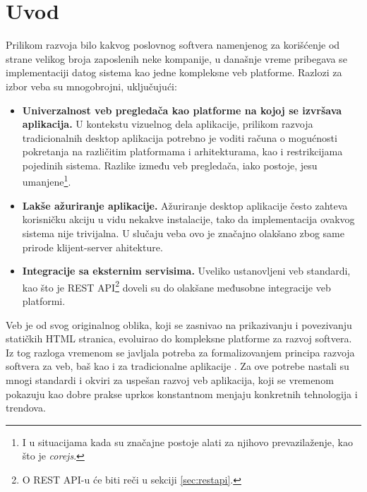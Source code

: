 \documentclass[12pt,oneside]{memoir}
\begin{document}
\frontmatter
\naslovna
\komisija
\apstrakt
\tableofcontents*

\mainmatter

\chapter{Uvod}

Prilikom razvoja bilo kakvog poslovnog softvera namenjenog za korišćenje od strane velikog broja zaposlenih neke kompanije, u današnje vreme pribegava se implementaciji datog sistema kao jedne kompleksne veb platforme. Razlozi za izbor veba su mnogobrojni, uključujući:

\begin{itemize}
    \item \textbf{Univerzalnost veb pregledača kao platforme na kojoj se izvršava aplikacija.} U kontekstu vizuelnog dela aplikacije, prilikom razvoja tradicionalnih desktop aplikacija potrebno je voditi računa o mogućnosti pokretanja na različitim platformama i arhitekturama, kao i restrikcijama pojedinih sistema. Razlike između veb pregledača, iako postoje, jesu umanjene\footnote{I u situacijama kada su značajne postoje alati za njihovo prevazilaženje, kao što je \textit{corejs}.}. 
    \item \textbf{Lakše ažuriranje aplikacije.} Ažuriranje desktop aplikacije često zahteva korisničku akciju u vidu nekakve instalacije, tako da implementacija ovakvog sistema nije trivijalna. U slučaju veba ovo je značajno olakšano zbog same prirode klijent-server ahitekture.
    \item \textbf{Integracije sa eksternim servisima.} Uveliko ustanovljeni veb standardi, kao što je REST API\footnote{O REST API-u će biti reči u sekciji \ref{sec:restapi}.} doveli su do olakšane međusobne integracije veb platformi.
\end{itemize}

Veb je od svog originalnog oblika, koji se zasnivao na prikazivanju i povezivanju statičkih HTML stranica, evoluirao do kompleksne platforme za razvoj softvera. Iz tog razloga vremenom se javljala potreba za formalizovanjem principa razvoja softvera za veb, baš kao i za tradicionalne aplikacije \cite{web_evolution}. Za ove potrebe nastali su mnogi standardi i okviri za uspešan razvoj veb aplikacija, koji se vremenom pokazuju kao dobre prakse uprkos konstantnom menjaju konkretnih tehnologija i trendova.
\end{document}
